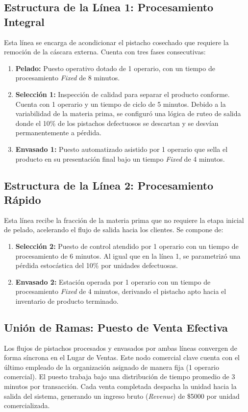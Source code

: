 \documentclass{llncs}
\begin{document}
\subsection{Estructura de la Línea 1: Procesamiento Integral}
Esta línea se encarga de acondicionar el pistacho cosechado que requiere la remoción de la cáscara externa. Cuenta con tres fases consecutivas:
\begin{enumerate}
    \item \textbf{Pelado:} Puesto operativo dotado de 1 operario, con un tiempo de procesamiento \textit{Fixed} de 8 minutos.
    \item \textbf{Selección 1:} Inspección de calidad para separar el producto conforme. Cuenta con 1 operario y un tiempo de ciclo de 5 minutos. Debido a la variabilidad de la materia prima, se configuró una lógica de ruteo de salida donde el 10\% de los pistachos defectuosos se descartan y se desvían permanentemente a pérdida.
    \item \textbf{Envasado 1:} Puesto automatizado asistido por 1 operario que sella el producto en su presentación final bajo un tiempo \textit{Fixed} de 4 minutos.
\end{enumerate}

\subsection{Estructura de la Línea 2: Procesamiento Rápido}
Esta línea recibe la fracción de la materia prima que no requiere la etapa inicial de pelado, acelerando el flujo de salida hacia los clientes. Se compone de:
\begin{enumerate}
    \item \textbf{Selección 2:} Puesto de control atendido por 1 operario con un tiempo de procesamiento de 6 minutos. Al igual que en la línea 1, se parametrizó una pérdida estocástica del 10\% por unidades defectuosas.
    \item \textbf{Envasado 2:} Estación operada por 1 operario con un tiempo de procesamiento \textit{Fixed} de 4 minutos, derivando el pistacho apto hacia el inventario de producto terminado.
\end{enumerate}

\subsection{Unión de Ramas: Puesto de Venta Efectiva}
Los flujos de pistachos procesados y envasados por ambas líneas convergen de forma síncrona en el Lugar de Ventas. Este nodo comercial clave cuenta con el último empleado de la organización asignado de manera fija (1 operario comercial). El puesto trabaja bajo una distribución de tiempo promedio de 3 minutos por transacción. Cada venta completada despacha la unidad hacia la salida del sistema, generando un ingreso bruto (\textit{Revenue}) de \$5000 por unidad comercializada.
\end{document}
